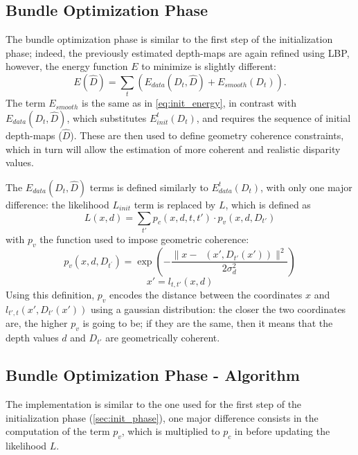 \documentclass[notitlepage,english]{hgbreport}
\newcommand{\Acronym}[1]{{#1}}
\newcommand{\LBP}{\Acronym{LBP}}
\begin{document}
\subsection{Bundle Optimization Phase}
The bundle optimization phase is similar to the first step of the initialization phase; indeed, the previously estimated depth-maps are again refined using \LBP{}, however, the energy function $E$ to minimize is slightly different:
\begin{equation}
	E(\hat D) = \sum_{t} \left(E_{data}(D_t, \hat D) + E_{smooth}(D_t)\right).
\end{equation}
The term $E_{smooth}$ is the same as in \cref{eq:init_energy}, in contrast with $E_{data}(D_t,\hat D)$, which substitutes $E^t_{init}(D_t)$, and requires the sequence of initial depth-maps ($\hat D$). These  are then used to define geometry coherence constraints, which in turn will allow the estimation of more coherent and realistic disparity values.

The $E_{data}(D_t, \hat D)$ terms is defined similarly to $E^t_{data}(D_t)$, with only one major difference: the likelihood $L_{init}$ term is replaced by $L$, which is defined as
$$
L(x, d) = \sum_{t'} p_c(x,d,t,t')\cdot p_v(x, d, D_{t'})
$$
with $p_v$ the function used to impose geometric coherence:
\begin{equation} \label{eq:pv}
	p_v(x,d,D_{t^\prime}) = \exp \left(-\frac{\lVert x - \mathop{l_{t',t}}(x', D_{t'}(x')) \rVert^2}{2\sigma^2_d}\right)
\end{equation}
$$x'= l_{t,t'}(x,d)$$
Using this definition, $p_v$ encodes the distance between the coordinates $x$ and $l_{t',t}(x', D_{t'}(x'))$ using a gaussian distribution: the closer the two coordinates are, the higher $p_v$ is going to be; if they are the same, then it means that the depth values $d$ and $D_{t'}$ are geometrically coherent.



\subsection{Bundle Optimization Phase - Algorithm}
The implementation is similar to the one used for the first step of the initialization phase (\cref{sec:init_phase}), one major difference consists in the computation of the term $p_v$, which is multiplied to $p_c$ in before updating the likelihood $L$.
\end{document}
